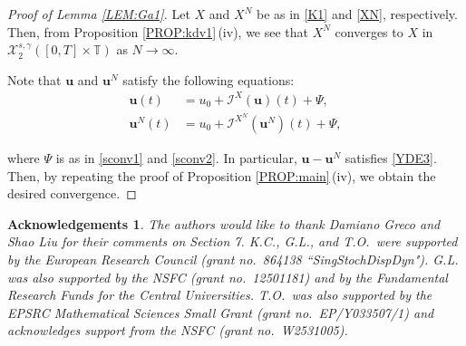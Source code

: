 \documentclass[letterpaper, 11pt,  reqno]{amsart}
\newcommand{\1}{\hspace{0.5mm}\text{I}\hspace{0.5mm}}
\newcommand{\I}{\mathcal{I}}
\newcommand{\noi}{\noindent}
\newcommand{\T}{\mathbb{T}}
\newcommand{\g}{\gamma}
\newcommand{\cX}{\mathcal{X}}
\newcommand{\uu}{\mathbf{u}}
\newtheorem*{ackno}{Acknowledgements}
\numberwithin{equation}{section}
\numberwithin{theorem}{section}
\begin{document}
 
\begin{proof}[Proof of Lemma \ref{LEM:Ga1}]

Let $X$ and $X^N$ be as in 
\eqref{K1} and 
\eqref{XN},   respectively.
Then, 
from Proposition \ref{PROP:kdv1}\,(iv), 
we see that 
$X^N$ converges to  $X$ 
in  $ \cX^{s, \g}_2([0, T]\times \T)$ as $N \to \infty$.

Note that $\uu$ and $\uu^N$ satisfy the following equations:
\begin{align*}
\uu(t) & = u_0 + \I^{X}(\uu)(t) + \Psi, \\
\uu^N(t) & = u_0 + \I^{X^N}(\uu^N)(t) + \Psi, 
\end{align*}

\noi
where $\Psi$ is as in \eqref{sconv1} and \eqref{sconv2}.
In particular, $\uu - \uu^N$ satisfies \eqref{YDE3}.
Then, by repeating the proof of 
Proposition \ref{PROP:main}\,(iv), 
we obtain the desired convergence.
\end{proof}
	









\begin{ackno}\rm
The authors would like to thank Damiano Greco and Shao Liu
for their comments on Section 7.
K.C., G.L., and T.O.~were supported by the European Research Council (grant no.~864138 ``SingStochDispDyn").
G.L. was also supported by the NSFC (grant no.~12501181)
and   by the Fundamental Research Funds for the Central Universities. 
T.O.~was also supported by the EPSRC 
Mathematical Sciences
Small Grant  (grant no.~EP/Y033507/1)
and acknowledges support from  
the NSFC (grant no.~W2531005).


\end{ackno}
\end{document}
